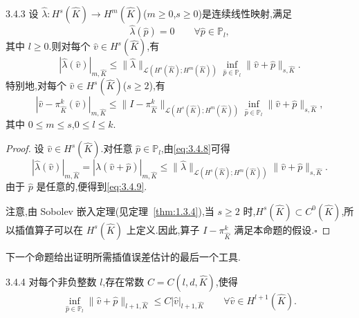 \begin{proposition}{3.4.3}
设 \(\widehat\lambda\colon H^s(\widehat K)\to H^m(\widehat K)\)(\(m\ge0\),\(s\ge0\))是连续线性映射,满足
\begin{equation}\label{eq:3.4.8}
  \widehat\lambda(\widehat p)=0\qquad\forall\widehat p\in\mathbb P_l,
\end{equation}
其中 \(l\ge0\).则对每个 \(\widehat v\in H^s(\widehat K)\),有
\begin{equation}\label{eq:3.4.9}
  |\widehat\lambda(\widehat v)|_{m,\widehat K}
    \le\|\widehat\lambda\|_{\mathcal L(H^s(\widehat K);H^m(\widehat K))}
       \inf_{\widehat p\in\mathbb P_l}\|\widehat v+\widehat p\|_{s,\widehat K}.
\end{equation}
特别地,对每个 \(\widehat v\in H^s(\widehat K)\)(\(s\ge2\)),有
\[
  |\widehat v-\pi_{\widehat K}^k(\widehat v)|_{m,\widehat K}
  \le\|I-\pi_{\widehat K}^k\|_{\mathcal L(H^s(\widehat K);H^m(\widehat K))}
     \inf_{\widehat p\in\mathbb P_l}\|\widehat v+\widehat p\|_{s,\widehat K},
\]
其中 \(0\le m\le s\),\(0\le l\le k\).
\end{proposition}

\begin{proof}
设 \(\widehat v\in H^s(\widehat K)\).对任意 \(\widehat p\in\mathbb P_l\),由\eqref{eq:3.4.8}可得
\[
  |\widehat\lambda(\widehat v)|_{m,\widehat K}
   =|\widehat\lambda(\widehat v+\widehat p)|_{m,\widehat K}
   \le\|\widehat\lambda\|_{\mathcal L(H^s(\widehat K);H^m(\widehat K))}
      \|\widehat v+\widehat p\|_{s,\widehat K}.
\]
由于 \(\widehat p\) 是任意的,便得到\eqref{eq:3.4.9}.

注意,由 Sobolev 嵌入定理(见定理~\ref{thm:1.3.4}),当 \(s\ge2\) 时,\(H^s(\widehat K)\subset C^0(\widehat K)\),所以插值算子可以在 \(H^s(\widehat K)\) 上定义.因此,算子 \(I-\pi_{\widehat K}^k\) 满足本命题的假设.\hfill\(\square\)
\end{proof}

下一个命题给出证明所需插值误差估计的最后一个工具.

\begin{proposition}{3.4.4}
对每个非负整数 \(l\),存在常数 \(C=C(l,d,\widehat K)\),使得
\begin{equation}\label{eq:3.4.10}
  \inf_{\widehat p\in\mathbb P_l}\|\widehat v+\widehat p\|_{l+1,\widehat K}
  \le C|\widehat v|_{l+1,\widehat K}
  \qquad\forall\widehat v\in H^{l+1}(\widehat K).
\end{equation}
\end{proposition}

